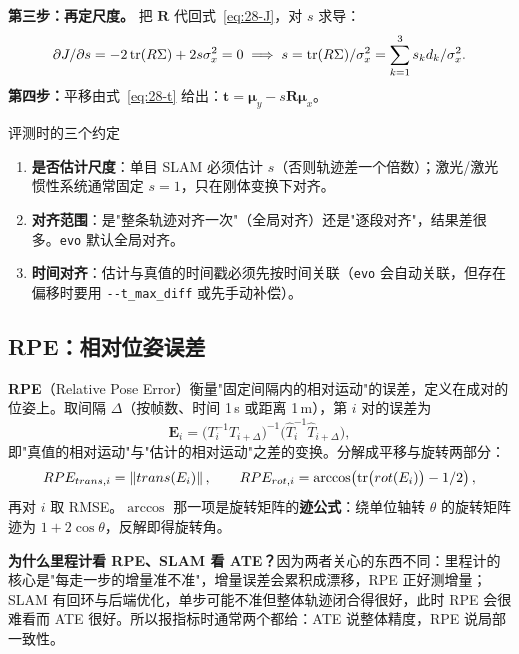 \textbf{第三步：再定尺度。} 把 $\bm{R}$ 代回式~\eqref{eq:28-J}，对 $s$ 求导：
\begin{equation}
\partial J/\partial s=-2\operatorname{tr}(R\Sigma)+2s\sigma_x^{2}=0
\;\Longrightarrow\;
s=\operatorname{tr}(R\Sigma)/\sigma_x^{2}=\sum_{k=1}^{3}s_kd_k/\sigma_x^{2}.
\label{eq:28-s}
\end{equation}
\textbf{第四步：}平移由式~\eqref{eq:28-t} 给出：$\bm{t}=\bm{\mu}_y-s\bm{R}\bm{\mu}_x$。

\begin{keybox}{评测时的三个约定}
\begin{enumerate}
  \item \textbf{是否估计尺度}：单目 SLAM 必须估计 $s$（否则轨迹差一个倍数）；激光/激光惯性系统通常固定 $s=1$，只在刚体变换下对齐。
  \item \textbf{对齐范围}：是"整条轨迹对齐一次"（全局对齐）还是"逐段对齐"，结果差很多。\lstinline{evo} 默认全局对齐。
  \item \textbf{时间对齐}：估计与真值的时间戳必须先按时间关联（\lstinline{evo} 会自动关联，但存在偏移时要用 \lstinline{--t_max_diff} 或先手动补偿）。
\end{enumerate}
\end{keybox}

\subsection{RPE：相对位姿误差}

\textbf{RPE}（Relative Pose Error）衡量"固定间隔内的相对运动"的误差，定义在成对的位姿上。取间隔 $\Delta$（按帧数、时间 1\,s 或距离 1\,m），第 $i$ 对的误差为
\begin{equation}
\bm{E}_i=\bigl(T_i^{-1}T_{i+\Delta}\bigr)^{-1}\bigl(\hat{T}_i^{-1}\hat{T}_{i+\Delta}\bigr),
\label{eq:28-rpe}
\end{equation}
即"真值的相对运动"与"估计的相对运动"之差的变换。分解成平移与旋转两部分：
\begin{equation}
RPE_{trans,i}=\left\lVert trans(E_i) \right\rVert,\qquad
RPE_{rot,i}=\arccos\!\left(\operatorname{tr}\bigl(rot(E_i)\bigr)-1/2\right),
\end{equation}
再对 $i$ 取 RMSE。$\arccos$ 那一项是旋转矩阵的\textbf{迹公式}：绕单位轴转 $\theta$ 的旋转矩阵迹为 $1+2\cos\theta$，反解即得旋转角。

\textbf{为什么里程计看 RPE、SLAM 看 ATE？}因为两者关心的东西不同：里程计的核心是"每走一步的增量准不准"，增量误差会累积成漂移，RPE 正好测增量；SLAM 有回环与后端优化，单步可能不准但整体轨迹闭合得很好，此时 RPE 会很难看而 ATE 很好。所以报指标时通常两个都给：ATE 说整体精度，RPE 说局部一致性。

